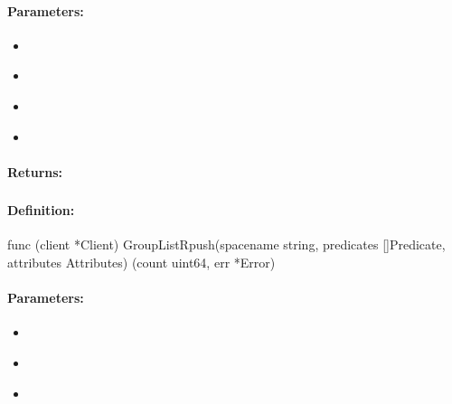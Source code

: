 \paragraph{Parameters:}
\begin{itemize}[noitemsep]
\item {}\\

\item {}\\

\item {}\\

\item {}\\

\end{itemize}

\paragraph{Returns:}


\pagebreak
\subsubsection{}
\label{api:Go:GroupListRpush}


\paragraph{Definition:}
\begin{gocode}
func (client *Client) GroupListRpush(spacename string, predicates []Predicate, attributes Attributes) (count uint64, err *Error)
\end{gocode}

\paragraph{Parameters:}
\begin{itemize}[noitemsep]
\item {}\\

\item {}\\

\item {}\\

\end{itemize}

